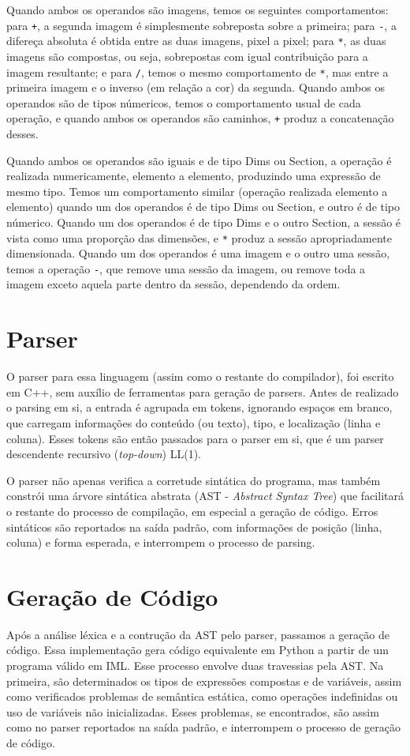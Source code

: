 \documentclass{article}
\begin{document}
Quando ambos os operandos são imagens, temos os seguintes comportamentos: para \texttt{+}, a segunda imagem é simplesmente sobreposta sobre a primeira; para \texttt{-}, a difereça absoluta é obtida entre as duas imagens, pixel a pixel; para \texttt{*}, as duas imagens são compostas, ou seja, sobrepostas com igual contribuição para a imagem resultante; e para \texttt{/}, temos o mesmo comportamento de \texttt{*}, mas entre a primeira imagem e o inverso (em relação a cor) da segunda. Quando ambos os operandos são de tipos númericos, temos o comportamento usual de cada operação, e quando ambos os operandos são caminhos, \texttt{+} produz a concatenação desses.

Quando ambos os operandos são iguais e de tipo Dims ou Section, a operação é realizada numericamente, elemento a elemento, produzindo uma expressão de mesmo tipo. Temos um comportamento similar (operação realizada elemento a elemento) quando um dos operandos é de tipo Dims ou Section, e outro é de tipo númerico. Quando um dos operandos é de tipo Dims e o outro Section, a sessão é vista como uma proporção das dimensões, e \texttt{*} produz a sessão apropriadamente dimensionada. Quando um dos operandos é uma imagem e o outro uma sessão, temos a operação \texttt{-}, que remove uma sessão da imagem, ou remove toda a imagem exceto aquela parte dentro da sessão, dependendo da ordem.

\section{Parser}
\label{sec:parser}
O parser para essa linguagem (assim como o restante do compilador), foi escrito em C++, sem auxílio de ferramentas para geração de parsers. Antes de realizado o parsing em si, a entrada é agrupada em tokens, ignorando espaços em branco, que carregam informações do conteúdo (ou texto), tipo, e localização (linha e coluna). Esses tokens são então passados para o parser em si, que é um parser descendente recursivo (\textit{top-down}) LL(1). 

O parser não apenas verifica a corretude sintática do programa, mas também constrói uma árvore sintática abstrata (AST - \textit{Abstract Syntax Tree}) que facilitará o restante do processo de compilação, em especial a geração de código. Erros sintáticos são reportados na saída padrão, com informações de posição (linha, coluna) e forma esperada, e interrompem o processo de parsing.

\section{Geração de Código}
\label{sec:geracao}
Após a análise léxica e a contrução da AST pelo parser, passamos a geração de código. Essa implementação gera código equivalente em Python a partir de um programa válido em IML. Esse processo envolve duas travessias pela AST. Na primeira, são determinados os tipos de expressões compostas e de variáveis, assim como verificados problemas de semântica estática, como operações indefinidas ou uso de variáveis não inicializadas. Esses problemas, se encontrados, são assim como no parser reportados na saída padrão, e interrompem o processo de geração de código.
\end{document}
